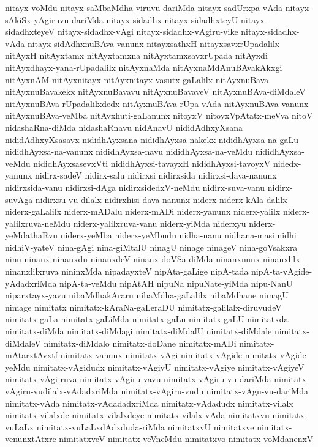 {nitayx-voMdu
nitayx-saMbaMdha-viruvu-dariMda
nitayx-sadUrxpa-vAda
nitayx-sAkiSx-yAgiruvu-dariMda
nitayx-sidadhx
nitayx-sidadhxteyU
nitayx-sidadhxteyeV
nitayx-sidadhx-vAgi
nitayx-sidadhx-vAgiru-vike
nitayx-sidadhx-vAda
nitayx-sidAdhxnuBAva-vanunx
nitayxsathxH
nitayxsavxrUpadalilx
nitAyxH
nitAyxtamx
nitAyxtamxna
nitAyxtamxsavxrUpada
nitAyxdi
nitAyxdhayx-yana-rUpadalilx
nitAyxnaMda
nitAyxnaMdAnuBAvakAkxgi
nitAyxnAM
nitAyxnitayx
nitAyxnitayx-vasutx-gaLalilx
nitAyxnuBava
nitAyxnuBavakekx
nitAyxnuBavavu
nitAyxnuBavaveV
nitAyxnuBAva-diMdaleV
nitAyxnuBAva-rUpadalilxdedx
nitAyxnuBAva-rUpa-vAda
nitAyxnuBAva-vanunx
nitAyxnuBAva-veMba
nitAyxhuti-gaLanunx
nitoyxV
nitoyxVpAtatx-meVva
nitoV
nidashaRna-diMda
nidashaRnavu
nidAnavU
nididAdhxyXsana
nididAdhxyXsasavx
nididhAyxsana
nididhAyxsa-nakekx
nididhAyxsa-na-gaLu
nididhAyxsa-na-vanunx
nididhAyxsa-navu
nididhAyxsa-na-veMdu
nididhAyxsa-veMdu
nididhAyxsasevxVti
nididhAyxsi-tavayxH
nididhAyxsi-tavoyxV
nidedx-yanunx
nidirx-sadeV
nidirx-salu
nidirxsi
nidirxsida
nidirxsi-dava-nanunx
nidirxsida-vanu
nidirxsi-dAga
nidirxsidedxV-neMdu
nidirx-suva-vanu
nidirx-suvAga
nidirxsu-vu-dilalx
nidirxhisi-dava-nanunx
niderx
niderx-kAla-dalilx
niderx-gaLalilx
niderx-mADalu
niderx-mADi
niderx-yanunx
niderx-yalilx
niderx-yalilxruva-neMdu
niderx-yalilxruva-vanu
niderx-yiMda
niderxyu
niderx-yeMdathaRvu
niderx-yeMba
niderx-yeMbudu
nidha-nanu
nidhana-masi
nidhi
nidhiV-yateV
nina-gAgi
nina-giMtalU
ninagU
ninage
ninageV
nina-goVsakxra
ninu
ninanx
ninanxdu
ninanxdeV
ninanx-doVSa-diMda
ninanxnunx
ninanxlilx
ninanxlilxruva
nininxMda
nipadayxteV
nipAta-gaLige
nipA-tada
nipA-ta-vAgide-yAdadxriMda
nipA-ta-veMdu
nipAtAH
nipuNa
nipuNate-yiMda
nipu-NanU
niparxtayx-yavu
nibaMdhakAraru
nibaMdha-gaLalilx
nibaMdhane
nimagU
nimage
nimitatx
nimitatx-kAraNa-gaLeraDU
nimitatx-galilalx-diruvudeV
nimitatx-gaLa
nimitatx-gaLiMda
nimitatx-gaLu
nimitatx-gaLU
nimitatxda
nimitatx-diMda
nimitatx-diMdagi
nimitatx-diMdalU
nimitatx-diMdale
nimitatx-diMdaleV
nimitatx-diMdalo
nimitatx-doDane
nimitatx-mADi
nimitatx-mAtarxtAvxtf
nimitatx-vanunx
nimitatx-vAgi
nimitatx-vAgide
nimitatx-vAgide-yeMdu
nimitatx-vAgidudx
nimitatx-vAgiyU
nimitatx-vAgiye
nimitatx-vAgiyeV
nimitatx-vAgi-ruva
nimitatx-vAgiru-vavu
nimitatx-vAgiru-vu-dariMda
nimitatx-vAgiru-vudilalx-vAdadxriMda
nimitatx-vAgiru-vudu
nimitatx-vAgu-vu-dariMda
nimitatx-vAda
nimitatx-vAdadadxriMda
nimitatx-vAdadudx
nimitatx-vilalx
nimitatx-vilalxde
nimitatx-vilalxdeye
nimitatx-vilalx-vAda
nimitatxvu
nimitatx-vuLaLx
nimitatx-vuLaLxdAdxduda-riMda
nimitatxvU
nimitatxve
nimitatx-venunxtAtxre
nimitatxveV
nimitatx-veVneMdu
nimitatxvo
nimitatx-voMdanenxV
}
